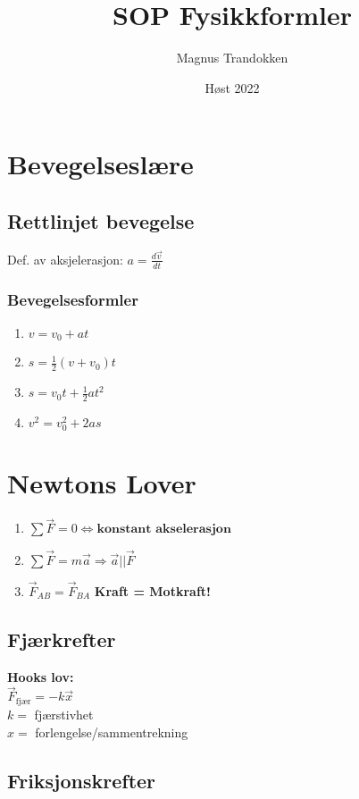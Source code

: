 \documentclass[12pt]{article}
\title{SOP Fysikkformler}
\author{Magnus Trandokken}
\date{Høst 2022}
\begin{document}
\centering
{}
\maketitle

\newpage
{}
\RaggedRight
\tableofcontents
\newpage

\section{Bevegelseslære}
\subsection{Rettlinjet bevegelse}
Def. av aksjelerasjon: $a = \frac{d\Vec{v}}{dt}$

\subsubsection{Bevegelsesformler}
\begin{enumerate}
    \item $v = v_0+at$
    \item $s = \frac{1}{2}(v+v_0)t$
    \item $s = v_0t+\frac{1}{2}at^2$
    \item $v^2 = v_0^2+2as$
\end{enumerate}
\section{Newtons Lover}
\begin{enumerate}
    \item $\sum{\Vec{F}} = 0 \Leftrightarrow \textbf{konstant akselerasjon }$
    \item $\sum{\Vec{F}} = m\Vec{a} \Rightarrow \Vec{a} || \Vec{F}$
    \item $\Vec{F}_{AB} = \Vec{F}_{BA}$ \textbf{Kraft = Motkraft!}
\end{enumerate}
\subsection{Fjærkrefter}
\textbf{Hooks lov: }\\ $\Vec{F}_{\text{fjær}} = -k\Vec{x}$\\
$k =$ fjærstivhet\\ $x =$ forlengelse/sammentrekning

\subsection{Friksjonskrefter}
\end{document}
